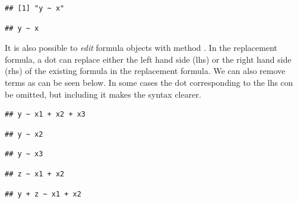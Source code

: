 \documentclass[krantz2]{krantz}\usepackage{knitr}%
\begin{document}
\begin{explainbox}
\begin{knitrout}\footnotesize
{}\color{fgcolor}\begin{kframe}
\begin{alltt}
 \hlkwb{<-}  \hlopt{~} 
\end{alltt}
\begin{verbatim}
## [1] "y ~ x"
\end{verbatim}
\begin{alltt}
\end{alltt}
\begin{verbatim}
## y ~ x
\end{verbatim}
\end{kframe}
\end{knitrout}

It is also possible to \emph{edit} formula objects with method . In the replacement formula, a dot can replace either the left hand side (lhs) or the right hand side (rhs) of the existing formula in the replacement formula. We can also remove terms as can be seen below. In some cases the dot corresponding to the lhs con be omitted, but including it makes the syntax clearer.

\begin{knitrout}\footnotesize
{}\color{fgcolor}\begin{kframe}
\begin{alltt}
 \hlkwb{<-}  \hlopt{~}  \hlopt{+} 
 \hlopt{~}  \hlopt{+} 
\end{alltt}
\begin{verbatim}
## y ~ x1 + x2 + x3
\end{verbatim}
\begin{alltt}
 \hlopt{~}  \hlopt{-} 
\end{alltt}
\begin{verbatim}
## y ~ x2
\end{verbatim}
\begin{alltt}
 \hlopt{~} 
\end{alltt}
\begin{verbatim}
## y ~ x3
\end{verbatim}
\begin{alltt}
 \hlopt{~} 
\end{alltt}
\begin{verbatim}
## z ~ x1 + x2
\end{verbatim}
\begin{alltt}
 \hlopt{+}  \hlopt{~} 
\end{alltt}
\begin{verbatim}
## y + z ~ x1 + x2
\end{verbatim}
\end{kframe}
\end{knitrout}


\end{explainbox}
\end{document}
